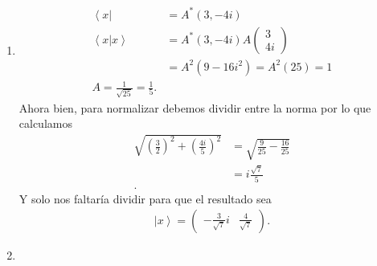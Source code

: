 \documentclass{report}
\begin{document}

\sol

\begin{enumerate}
	\item 
		\begin{align*}
		\left< x \right| &= A^*(3, -4i)\\
		\left< x | x \right> &= A^* (3, -4i)A\begin{pmatrix} 3\\ 4i \end{pmatrix}  \\
		&= A^2(9-16i^2)=A^2(25)=1 \\
		A = \frac{1}{\sqrt{25} }=\frac{1}{5}
		.\end{align*}
		Ahora bien, para normalizar debemos dividir entre la norma por lo que calculamos
		\begin{align*}
			\sqrt{\left( \frac{3}{2} \right)^2 + \left( \frac{4i}{5} \right)^2 } &= \sqrt{\frac{9}{25}-\frac{16}{25}}\\  
			&= i \frac{\sqrt{7} }{5} \\
		.\end{align*}
		Y solo nos faltaría dividir para que el resultado sea 
		\begin{align*}
			\left| x \right> = \begin{pmatrix} -\frac{3}{\sqrt{7} }i & \frac{4}{\sqrt{7} } \end{pmatrix} 
		.\end{align*}
	\item 
\end{enumerate}
\end{document}

